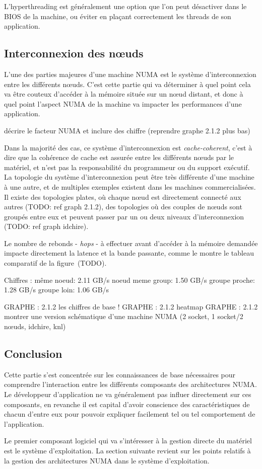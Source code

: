 L'hyperthreading est généralement une option que l'on peut désactiver dans le BIOS de la machine, ou éviter en plaçant correctement les threads de son application.


\subsection{Interconnexion des nœuds}\label{sec:context:numa:interconnect}

L'une des parties majeures d'une machine NUMA est le système d'interconnexion entre les différents nœuds.
C'est cette partie qui va déterminer à quel point cela va être couteux d'accéder à la mémoire située sur un nœud distant, et donc à quel point l'aspect NUMA de la machine va impacter les performances d'une application.

\begin{todo}
  décrire le facteur NUMA et inclure des chiffre (reprendre graphe 2.1.2 plus bas)
\end{todo}

Dans la majorité des cas, ce système d'interconnexion est \emph{cache-coherent}, c'est à dire que la cohérence de cache est assurée entre les différents nœuds par le matériel, et n'est pas la responsabilité du programmeur ou du support exécutif.
La topologie du système d'interconnexion peut être très différente d'une machine à une autre, et de multiples exemples existent dans les machines commercialisées.
Il existe des topologies plates, où chaque nœud est directement connecté aux autres (TODO: ref graph 2.1.2), des topologies où des couples de nœuds sont groupés entre eux et peuvent passer par un ou deux niveaux d'interconnexion (TODO: ref graph idchire).

Le nombre de rebonds - \emph{hops} - à effectuer avant d'accéder à la mémoire demandée impacte directement la latence et la bande passante, comme le montre le tableau comparatif de la figure~(TODO).

Chiffres :
même noeud: 2.11 GB/s
noeud meme group: 1.50 GB/s
groupe proche: 1.28 GB/s
groupe loin: 1.06 GB/s

GRAPHE : 2.1.2 les chiffres de base !
GRAPHE : 2.1.2 heatmap
GRAPHE : 2.1.2 montrer une version schématique d'une machine NUMA (2 socket, 1 socket/2 nœuds, idchire, knl)




\subsection*{Conclusion}

Cette partie s'est concentrée sur les connaissances de base nécessaires pour comprendre l'interaction entre les différents composants des architectures NUMA.
Le développeur d'application ne va généralement pas influer directement sur ces composants, en revanche il est capital d'avoir conscience des caractéristiques de chacun d'entre eux pour pouvoir expliquer facilement tel ou tel comportement de l'application.

Le premier composant logiciel qui va s'intéresser à la gestion directe du matériel est le système d'exploitation.
La section suivante revient sur les points relatifs à la gestion des architectures NUMA dans le système d'exploitation.
